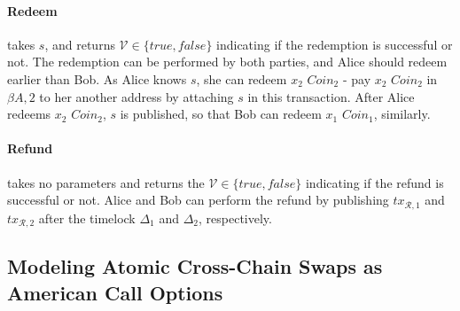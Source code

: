 \paragraph{Redeem}
takes $s$,
and returns $\mathcal{V} \in \{true, false\}$ indicating if the redemption is successful or not.
The redemption can be performed by both parties, and Alice should redeem earlier than Bob.
As Alice knows $s$, she can redeem $x_2$ $Coin_2$ - pay $x_2$ $Coin_2$ in $\beta{A, 2}$ to her another address by attaching $s$ in this transaction.
After Alice redeems $x_2$ $Coin_2$, $s$ is published, so that Bob can redeem $x_1$ $Coin_1$, similarly.

\paragraph{Refund}
takes no parameters and returns the $\mathcal{V} \in \{true, false\}$ indicating if the refund is successful or not.
Alice and Bob can perform the refund by publishing $tx_{\mathcal{R}, 1}$ and $tx_{\mathcal{R}, 2}$ after the timelock $\Delta_1$ and $\Delta
_2$, respectively.



\subsection{Modeling Atomic Cross-Chain Swaps as American Call Options}

